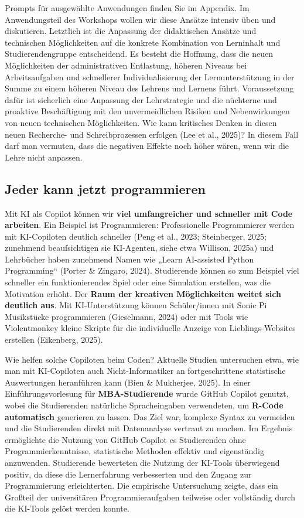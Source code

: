 \documentclass[
  ngerman,
  letterpaper,
  DIV=11]{scrreprt}
\begin{document}
Prompts für ausgewählte Anwendungen finden Sie im Appendix. Im
Anwendungsteil des Workshops wollen wir diese Ansätze intensiv üben und
diskutieren. Letztlich ist die Anpassung der didaktischen Ansätze und
technischen Möglichkeiten auf die konkrete Kombination von Lerninhalt
und Studierendengruppe entscheidend. Es besteht die Hoffnung, dass die
neuen Möglichkeiten der administrativen Entlastung, höheren Niveaus bei
Arbeitsaufgaben und schnellerer Individualisierung der Lernunterstützung
in der Summe zu einem höheren Niveau des Lehrens und Lernens führt.
Voraussetzung dafür ist sicherlich eine Anpassung der Lehrstrategie und
die nüchterne und proaktive Beschäftigung mit den unvermeidlichen
Risiken und Nebenwirkungen von neuen technischen Möglichkeiten. Wie kann
kritisches Denken in diesen neuen Recherche- und Schreibprozessen
erfolgen (Lee et al., 2025)? In diesem Fall darf man vermuten, dass die
negativen Effekte noch höher wären, wenn wir die Lehre nicht anpassen.

\subsection{Jeder kann jetzt programmieren}\label{sec-coding}

Mit KI als Copilot können wir \textbf{viel umfangreicher und schneller
mit Code arbeiten}. Ein Beispiel ist Programmieren: Professionelle
Programmierer werden mit KI-Copiloten deutlich schneller (Peng et al.,
2023; Steinberger, 2025; zunehmend beaufsichtigen sie KI-Agenten, siehe
etwa Willison, 2025a) und Lehrbücher haben zunehmend Namen wie „Learn
AI-assisted Python Programming`` (Porter \& Zingaro, 2024). Studierende
können so zum Beispiel viel schneller ein funktionierendes Spiel oder
eine Simulation erstellen, was die Motivation erhöht. Der \textbf{Raum
der kreativen Möglichkeiten weitet sich deutlich aus}. Mit
KI-Unterstützung können Schüler/innen mit Sonic Pi Musikstücke
programmieren (Gieselmann, 2024) oder mit Tools wie Violentmonkey kleine
Skripte für die individuelle Anzeige von Lieblings-Websites erstellen
(Eikenberg, 2025).

Wie helfen solche Copiloten beim Coden? Aktuelle Studien untersuchen
etwa, wie man mit KI-Copiloten auch Nicht-Informatiker an
fortgeschrittene statistische Auswertungen heranführen kann (Bien \&
Mukherjee, 2025). In einer Einführungsvorlesung für
\textbf{MBA-Studierende} wurde GitHub Copilot genutzt, wobei die
Studierenden natürliche Spracheingaben verwendeten, um \textbf{R-Code
automatisch} generieren zu lassen. Das Ziel war, komplexe Syntax zu
vermeiden und die Studierenden direkt mit Datenanalyse vertraut zu
machen. Im Ergebnis ermöglichte die Nutzung von GitHub Copilot es
Studierenden ohne Programmierkenntnisse, statistische Methoden effektiv
und eigenständig anzuwenden. Studierende bewerteten die Nutzung der
KI-Tools überwiegend positiv, da diese die Lernerfahrung verbesserten
und den Zugang zur Programmierung erleichterten. Die empirische
Untersuchung zeigte, dass ein Großteil der universitären
Programmieraufgaben teilweise oder vollständig durch die KI-Tools gelöst
werden konnte.
\end{document}
